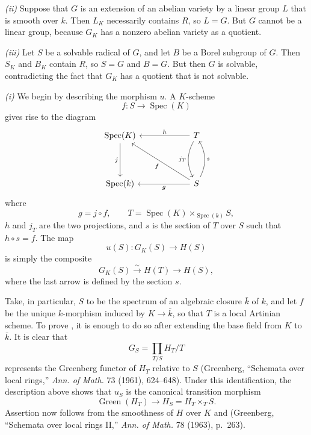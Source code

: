 \smallskip
\noindent\textit{(ii)} Suppose that \(G\) is an extension of an
abelian variety by a linear group \(L\) that is smooth over
\(k\).  Then \(L_K\) necessarily contains \(R\), so \(L=G\).
But \(G\) cannot be a linear group, because \(G_K\) has a nonzero
abelian variety as a quotient.

\smallskip
\noindent\textit{(iii)} Let \(S\) be a solvable radical of \(G\),
and let \(B\) be a Borel subgroup of \(G\).  Then \(S_K\) and
\(B_K\) contain \(R\), so \(S=G\) and \(B=G\).  But then \(G\)
is solvable, contradicting the fact that \(G_K\) has a quotient
that is not solvable.

\textit{(i)} We begin by describing the morphism \(u\).  A
\(K\)-scheme
\[
  f:S\longrightarrow\operatorname{Spec}(K)
\]
gives rise to the diagram
\[
\begin{tikzcd}[column sep=6.0em,row sep=4.0em]
  \operatorname{Spec}(K)
    \arrow[d,"j"'] &
  T
    \arrow[l,"h"']
    \arrow[d,bend right=28,"j_T"'] \\
  \operatorname{Spec}(k) &
  S
    \arrow[l,"g"]
    \arrow[ul,"f"]
    \arrow[u,bend right=28,"s"']
\end{tikzcd}
\]
where
\[
  g=j\circ f,\qquad
  T=\operatorname{Spec}(K)\times_{\operatorname{Spec}(k)}S,
\]
\(h\) and \(j_T\) are the two projections, and \(s\) is the
section of \(T\) over \(S\) such that \(h\circ s=f\).  The map
\[
  u(S):G_K(S)\longrightarrow H(S)
\]
is simply the composite
\[
  G_K(S)\xrightarrow{\sim}H(T)\longrightarrow H(S),
\]
where the last arrow is defined by the section \(s\).

Take, in particular, \(S\) to be the spectrum of an algebraic
closure \(\bar k\) of \(k\), and let \(f\) be the unique
\(k\)-morphism induced by \(K\to\bar k\), so that \(T\) is a
local Artinian scheme.  To prove , it is enough to do so after
extending the base field from \(K\) to \(\bar k\).  It is clear
that
\[
  G_S=\prod_{T/S}H_T/T
\]
represents the Greenberg functor of \(H_T\) relative to \(S\)
(Greenberg, ``Schemata over local rings,'' \emph{Ann. of
Math.} 73 (1961), 624--648).  Under this identification, the
description above shows that \(u_S\) is the canonical transition
morphism
\[
  \operatorname{Green}(H_T)\longrightarrow
  H_S=H_T\times_T S.
\]
Assertion  now follows from the smoothness of \(H\) over \(K\)
and (Greenberg, ``Schemata over local rings II,''
\emph{Ann. of Math.} 78 (1963), p.~263).

